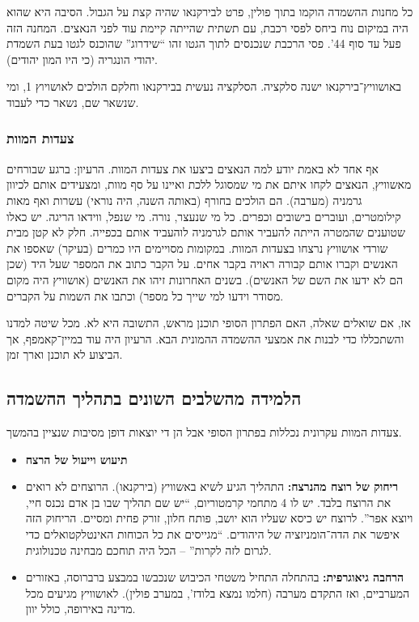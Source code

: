 \documentclass[a4paper]{book}
\begin{document}
	
	כל מחנות ההשמדה הוקמו בתוך פולין, פרט לבירקנאו שהיה קצת על הגבול. הסיבה היא שהוא היה במיקום נוח ביחס לפסי רכבת, עם תשתית שהייתה קיימת עוד לפני הנאצים. המחנה הזה פעל עד סוף 44'. פסי הרכבת שנכנסים לתוך הגטו זהו ``שידרוג'' שהוכנס לגטו בעת השמדת יהודי הונגריה (כי היו המון יהודים). 
	
	באושוויץ־בירקנאו ישנה סלקציה. הסלקציה נעשית בבירקנאו וחלקם הולכים לאושויוץ 1, ומי שנשאר שם, נשאר כדי לעבוד. 
	
	\subsubsection{צעדות המוות}
	אף אחד לא באמת יודע למה הנאצים ביצעו את צעדות המוות. הרעיון: ברגע שבורחים מאשוויץ, הנאצים לקחו איתם את מי שמסוגל ללכת ואיינו על סף מוות, ומצעידים אותם לכיוון גרמניה (מערבה). הם הולכים בחורף (באותה השנה, היה נוראי) עשרות ואף מאות קילומטרים, ועוברים בישובים וכפרים. כל מי שנעצר, נורה. מי שנפל, ווידאו הריגה. יש כאלו שטוענים שהמטרה הייתה להעביר אותם לגרמניה לוהעביד אותם בכפייה. חלק לא קטן מבית שורדי אושוויץ נרצחו בצעדות המוות. במקומות מסויימים היו כמרים (בעיקר) שאספו את האנשים וקברו אותם קבורה ראויה בקבר אחים. על הקבר כתוב את המספר שעל היד (שכן הם לא ידעו את השם של האנשים). בשנים האחרונות זיהו את האנשים (אושוויץ היה מקום מסודר וידעו למי שייך כל מספר) וכתבו את השמות על הקברים. 
	
	
	אז, אם שואלים שאלה, האם הפתרון הסופי תוכנן מראש, התשובה היא לא. מכל שיטה למדנו והשתכללו כדי לבנות את אמצעי ההשמדה ההמונית הבא. הרעיון היה עוד במיין־קאמפף, אך הביצוע לא תוכנן וארך זמן. 
	
	
	
	\subsection{הלמידה מהשלבים השונים בתהליך ההשמדה}
	צעדות המוות עקרונית נכללות בפתרון הסופי אבל הן די יוצאות דופן מסיבות שנציין בהמשך. 
	\begin{itemize}
		\item \textbf{תיעוש וייעול של הרצח}
		\item \textbf{ריחוק של רוצח מהנרצח: }התהליך הגיע לשיא באשוויץ (בירקנאו). הרוצחים לא רואים את הרוצח בלבד. יש לו 4 מתחמי קרמטוריום, ``יש שם תהליך שבו בן אדם נכנס חיי, ויוצא אפר''. לרוצח יש כיסא שעליו הוא יושב, פותח חלון, זורק פחית ומסיים. הריחוק הזה איפשר את הדה־הומניזציה של היהודים. ``מגייסים את כל הכוחות האינטלקטואלים כדי לגרום לזה לקרות'' – הכל היה תוחכם מבחינה טכנולוגית. 
		\item \textbf{הרחבה גיאוגרפית: }בהתחלה התחיל משטחי הכיבוש שנכבשו במבצע ברברוסה, באזורים המערביים, ואז התקדם מערבה (חלמו נמצא בלודז', במערב פולין). לאושוויץ מגיעים מכל מדינה באירופה, כולל יוון. 
	\end{itemize}
	
\end{document}
